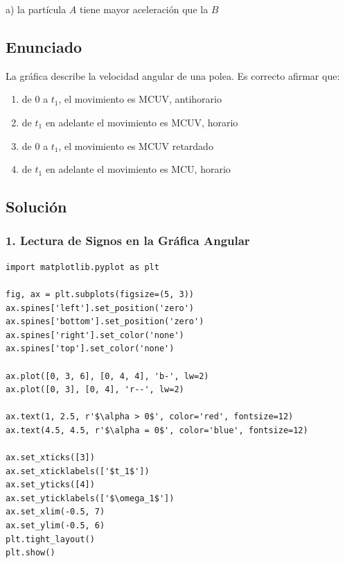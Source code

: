 \documentclass[12pt, a4paper]{article}
\begin{document}
\begin{tcolorbox}[colback=green!5!white, colframe=green!50!black, title=Respuesta Final]
\centering \Large a) la partícula $A$ tiene mayor aceleración que la $B$
\end{tcolorbox}

\newpage

\subsection*{Enunciado}
La gráfica describe la velocidad angular de una polea. Es correcto afirmar que:

\begin{center}
\end{center}

\begin{enumerate}[label=\alph*)]
    \item de $0$ a $t_1$, el movimiento es MCUV, antihorario
    \item de $t_1$ en adelante el movimiento es MCUV, horario
    \item de $0$ a $t_1$, el movimiento es MCUV retardado
    \item de $t_1$ en adelante el movimiento es MCU, horario
\end{enumerate}

\subsection*{Solución}

\subsubsection*{1. Lectura de Signos en la Gráfica Angular}

\begin{verbatim}
import matplotlib.pyplot as plt

fig, ax = plt.subplots(figsize=(5, 3))
ax.spines['left'].set_position('zero')
ax.spines['bottom'].set_position('zero')
ax.spines['right'].set_color('none')
ax.spines['top'].set_color('none')

ax.plot([0, 3, 6], [0, 4, 4], 'b-', lw=2)
ax.plot([0, 3], [0, 4], 'r--', lw=2)

ax.text(1, 2.5, r'$\alpha > 0$', color='red', fontsize=12)
ax.text(4.5, 4.5, r'$\alpha = 0$', color='blue', fontsize=12)

ax.set_xticks([3])
ax.set_xticklabels(['$t_1$'])
ax.set_yticks([4])
ax.set_yticklabels(['$\omega_1$'])
ax.set_xlim(-0.5, 7)
ax.set_ylim(-0.5, 6)
plt.tight_layout()
plt.show()
\end{verbatim}
\end{document}
